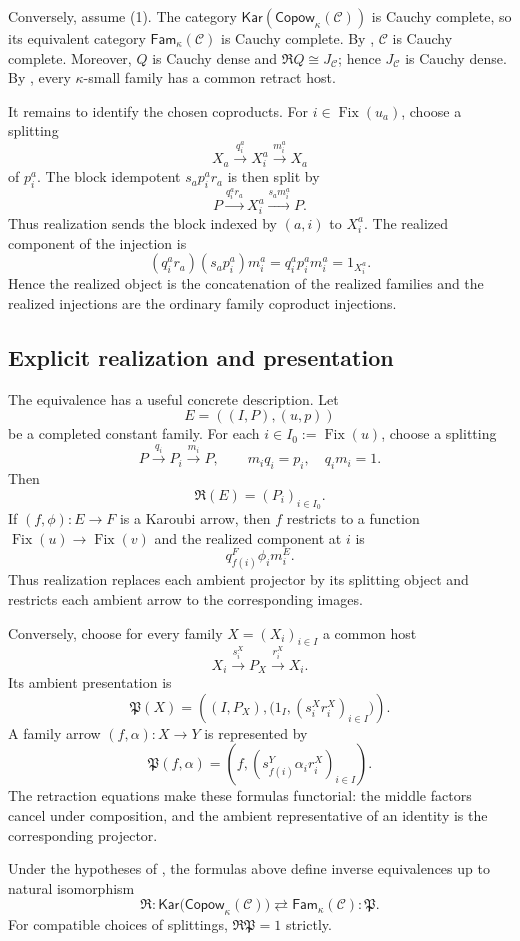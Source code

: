 \documentclass[runningheads,envcountsame]{llncs}
\newcommand{\Copow}{\mathsf{Copow}}
\newcommand{\Fam}{\mathsf{Fam}}
\newcommand{\Kar}{\mathsf{Kar}}
\newcommand{\Fix}{\operatorname{Fix}}
\newcommand{\Rlz}{\mathfrak R}
\newcommand{\Prs}{\mathfrak P}
\begin{document}
Conversely, assume (1).  The category
$\Kar(\Copow_\kappa(\mathcal C))$ is Cauchy complete, so its equivalent
category $\Fam_\kappa(\mathcal C)$ is Cauchy complete.  By
, $\mathcal C$ is Cauchy complete.  Moreover,
$Q$ is Cauchy dense and $\Rlz Q\cong J_{\mathcal C}$; hence
$J_{\mathcal C}$ is Cauchy dense.  By
, every $\kappa$-small family has a common
retract host.

It remains to identify the chosen coproducts.  For
$i\in\Fix(u_a)$, choose a splitting
$$
X_a\xrightarrow{q^a_i}X^a_i\xrightarrow{m^a_i}X_a
$$
of $p^a_i$.  The block idempotent $s_ap^a_ir_a$ is then split by
$$
P\xrightarrow{q^a_ir_a}X^a_i
\xrightarrow{s_am^a_i}P.
$$
Thus realization sends the block indexed by $(a,i)$ to $X^a_i$.  The
realized component of the injection is
$$
(q^a_ir_a)(s_ap^a_i)m^a_i
=
q^a_ip^a_im^a_i
=
1_{X^a_i}.
$$
Hence the realized object is the concatenation of the realized families and
the realized injections are the ordinary family coproduct injections.


\subsection{Explicit realization and presentation}
\label{app:realization}

The equivalence has a useful concrete description.  Let
$$
E=((I,P),(u,p))
$$
be a completed constant family.  For each $i\in I_0:=\Fix(u)$, choose a
splitting
$$
P\xrightarrow{q_i}P_i\xrightarrow{m_i}P,
\qquad
m_iq_i=p_i,
\quad
q_im_i=1.
$$
Then
$$
\Rlz(E)=(P_i)_{i\in I_0}.
$$
If $(f,\phi):E\to F$ is a Karoubi arrow, then $f$ restricts to a function
$\Fix(u)\to\Fix(v)$ and the realized component at $i$ is
$$
q^F_{f(i)}\phi_i m^E_i.
$$
Thus realization replaces each ambient projector by its splitting object and
restricts each ambient arrow to the corresponding images.

Conversely, choose for every family $X=(X_i)_{i\in I}$ a common host
$$
X_i\xrightarrow{s_i^X}P_X\xrightarrow{r_i^X}X_i.
$$
Its ambient presentation is
$$
\Prs(X)=
\left(
(I,P_X),
\bigl(1_I,(s_i^Xr_i^X)_{i\in I}\bigr)
\right).
$$
A family arrow $(f,\alpha):X\to Y$ is represented by
$$
\Prs(f,\alpha)
=
\left(
 f,
 (s^Y_{f(i)}\alpha_i r_i^X)_{i\in I}
\right).
$$
The retraction equations make these formulas functorial: the middle factors
cancel under composition, and the ambient representative of an identity is
the corresponding projector.

\begin{proposition}
\label{prop:explicit-equivalence-app}
Under the hypotheses of , the formulas above define
inverse equivalences up to natural isomorphism
$$
\Rlz:
\Kar\bigl(\Copow_\kappa(\mathcal C)\bigr)
\rightleftarrows
\Fam_\kappa(\mathcal C):\Prs.
$$
For compatible choices of splittings, $\Rlz\Prs=1$ strictly.
\end{proposition}
\end{document}
